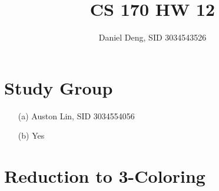 \documentclass[11pt]{article}
\title{CS 170 HW 12}
\author{Daniel Deng, SID 3034543526}
\date{}
\theoremstyle{definition}
\theoremstyle{remark}
\begin{document}
\maketitle

\section{Study Group}
\begin{enumerate}
\item[(a)] Auston Lin, SID 3034554056
\item[(b)] Yes
\end{enumerate}
\clearpage

\section{Reduction to 3-Coloring}
\end{document}
